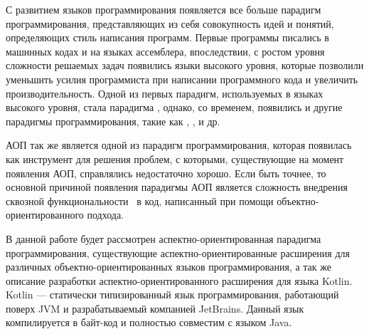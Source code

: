 \intro

С развитием языков программирования появляется все больше парадигм
программирования, представляющих из себя совокупность идей и понятий,
определяющих стиль написания программ.
Первые программы писались в машинных кодах и на языках ассемблера, впоследствии,
с ростом уровня сложности решаемых задач появились языки высокого уровня,
которые позволили уменьшить усилия программиста при написании программного кода
и увеличить производительность.
Одной из первых парадигм, используемых в языках высокого уровня, стала парадигма
, однако, со временем, появились и другие
парадигмы программирования, такие как ,
,  и др.

АОП так же является одной из парадигм программирования, которая появилась как
инструмент для решения проблем, с которыми, существующие на момент появления
АОП, справлялись недостаточно хорошо.
Если быть точнее, то основной причиной появления парадигмы АОП является
сложность внедрения сквозной функциональности~\cite{crosscutting_conserns} в
код, написанный при помощи объектно-ориентированного подхода.

В данной работе будет рассмотрен аспектно-ориентированная парадигма
программирования, существующие аспектно-ориентированные расширения для
различных объектно-ориентированных языков программирования, а так же описание
разработки аспектно-ориентированного расширения для языка Kotlin.
Kotlin --- статически типизированный язык программирования, работающий поверх
JVM и разрабатываемый компанией JetBrains. Данный язык компилируется в байт-код и полностью совместим с языком Java.